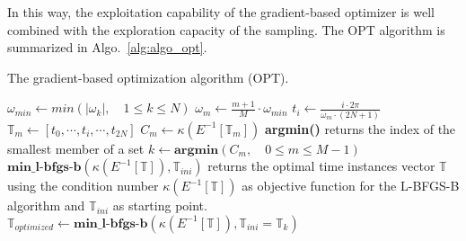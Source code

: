 In this way, the exploitation capability of the gradient-based
optimizer is well combined with the exploration capacity of the
sampling. The OPT algorithm is summarized in Algo.~\ref{alg:algo_opt}.
\begin{algorithm}[htb]
\caption{The gradient-based optimization algorithm (OPT).}
\label{alg:algo_opt}
\begin{algorithmic}
\STATE $\omega_{min} \leftarrow min \left( |\omega_k |,\quad 1 \leqslant k \leqslant N \right)$
    \STATE $\omega_m \leftarrow \frac{m + 1}{M} \cdot \omega_{min}$
        \STATE $t_i \leftarrow \displaystyle\frac{i \cdot 2 \pi}{\omega_m \cdot (2N + 1)}$
    \ENDFOR
    \STATE $\mathbb{T}_m \leftarrow [t_0, \cdots, t_i, \cdots, t_{2N}]$
    \STATE $C_m \leftarrow \kappa \left(E^{-1} \left[\mathbb{T}_m \right] \right)$
\ENDFOR
\STATE \textbf{argmin()} returns the index of the smallest member of a set
\STATE $k \leftarrow \textbf{argmin}\left(C_m,\quad 0\leqslant m \leqslant M-1\right)$
\STATE $\textbf{min\_l-bfgs-b}\left(\kappa \left(E^{-1} \left[\mathbb{T}\right]\right), \mathbb{T}_{ini}\right)$ returns the optimal 
time instances vector $\mathbb{T}$ using the condition number $\kappa\left(E^{-1} \left[\mathbb{T}\right]\right)$ as objective function 
for the L-BFGS-B algorithm and  $\mathbb{T}_{ini}$ as starting point.
\STATE $\mathbb{T}_{optimized} \leftarrow 
  \textbf{min\_l-bfgs-b}\left(\kappa\left(E^{-1} \left[\mathbb{T}\right]\right), \mathbb{T}_{ini}=\mathbb{T}_k\right)$
\end{algorithmic}
\end{algorithm}


